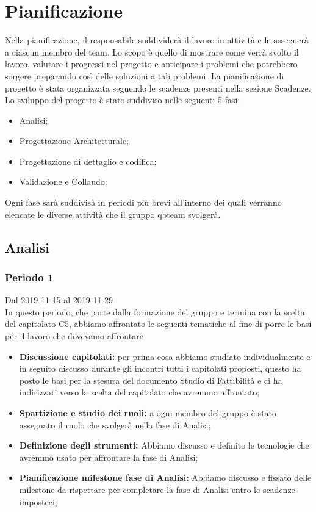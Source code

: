 \section{Pianificazione}
Nella pianificazione, il responsabile suddividerà il lavoro in attività e le assegnerà a ciascun membro del team.
Lo scopo è quello di mostrare come verrà svolto il lavoro, valutare i progressi nel progetto e anticipare i problemi che potrebbero sorgere preparando così delle soluzioni a tali problemi. 
La pianificazione di progetto è stata organizzata seguendo le scadenze presenti nella sezione Scadenze.
Lo sviluppo del progetto è stato suddiviso nelle seguenti 5 fasi: 
\begin{itemize}
	\item Analisi;
	\item Progettazione Architetturale;
	\item Progettazione di dettaglio e codifica;
	\item Validazione e Collaudo;
\end{itemize}
Ogni fase sarà suddivisà in periodi più brevi all'interno dei quali verranno elencate le diverse attività che il gruppo qbteam svolgerà.


\subsection{Analisi}

\subsubsection{Periodo 1} 
Dal 2019-11-15 al 2019-11-29\\
In questo periodo, che parte dalla formazione del gruppo e termina con la scelta del capitolato C5, abbiamo affrontato le seguenti tematiche al fine di porre le basi per il lavoro che dovevamo affrontare\\
\begin{itemize}
	\item \textbf{Discussione capitolati:} per prima cosa abbiamo studiato individualmente e in seguito discusso durante gli incontri tutti i capitolati proposti, questo ha posto le basi per la stesura del documento Studio di Fattibilità e ci ha indirizzati verso la scelta del capitolato che avremmo affrontato;
	\item \textbf{Spartizione e studio dei ruoli:} a ogni membro del gruppo è stato assegnato il ruolo che svolgerà nella fase di Analisi;
	\item \textbf{Definizione degli strumenti:} Abbiamo discusso e definito le tecnologie che avremmo usato per affrontare la fase di Analisi;
	\item \textbf{Pianificazione milestone fase di Analisi:} Abbiamo discusso e fissato delle milestone da rispettare per completare la fase di Analisi entro le scadenze imposteci;
\end{itemize}
